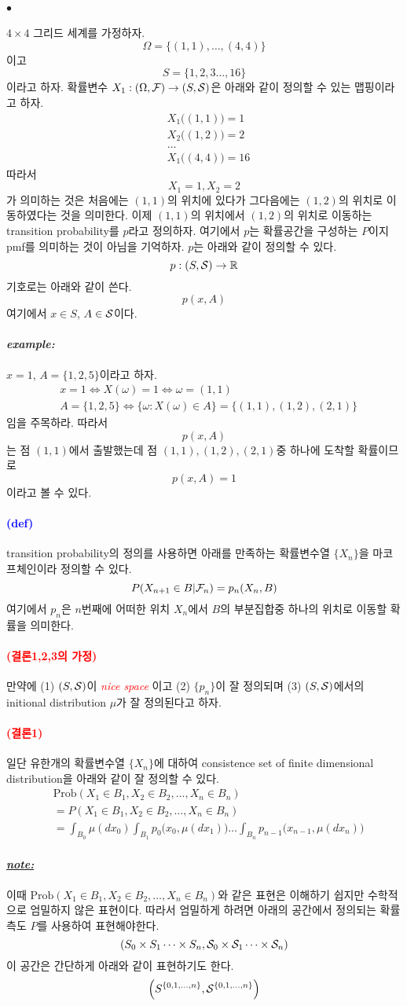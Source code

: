 \documentclass[12pt,oneside,english]{book}
\def\ck{\paragraph{\Large$\bullet$}\Large}
\def\note{\paragraph{\Large\textit{\underline{note:}}}\Large}
\def\ex{\paragraph{\Large\textit{example:}}\Large}
\newcommand{\parablue}[1]{\paragraph{\Large\textcolor{blue}{(#1)}}\Large}
\newcommand{\parared}[1]{\paragraph{\Large\textcolor{red}{(#1)}}\Large}
\begin{document}
\ck $4\times 4$ 그리드 세계를 가정하자. 
\[
\Omega=\{(1,1),\dots,(4,4)\}
\]
이고 
\[
S=\{1,2,3\dots,16\}
\]
이라고 하자. 확률변수 $X_1:(\Omega,{\cal F}) \to (S, {\cal S})$은 아래와 같이 정의할 수 있는 맵핑이라고 하자. 
\begin{align*}
& X_1\big((1,1)\big)=1\\ 
& X_2\big((1,2))=2\\ 
& \dots \\
& X_1\big((4,4)\big)=16
\end{align*}
따라서 
\[
X_1=1, X_2=2
\]
가 의미하는 것은 처음에는 $(1,1)$의 위치에 있다가 그다음에는 $(1,2)$의 위치로 이동하였다는 것을 의미한다. 이제 $(1,1)$의 위치에서 $(1,2)$의 위치로 이동하는 transition probability를 $p$라고 정의하자. 여기에서 $p$는 확률공간을 구성하는 $P$이지 pmf를 의미하는 것이 아님을 기억하자. $p$는 아래와 같이 정의할 수 있다. 
\[
p:(S,{\cal S}) \to \mathbb{R}
\]
기호로는 아래와 같이 쓴다. 
\[
p(x,A)
\]
여기에서 $x \in S$, $A \in {\cal S}$이다. 

\ex $x=1$, $A=\{1,2,5\}$이라고 하자. 
\begin{align*}
& x=1 \Leftrightarrow X(\omega)=1 \Leftrightarrow \omega=(1,1) \\ 
& A=\{1,2,5\} \Leftrightarrow \{\omega:X(\omega) \in A\}=\{(1,1),(1,2),(2,1)\}
\end{align*}
임을 주목하라. 따라서 
\[
p(x,A)
\] 
는 점 $(1,1)$에서 출발했는데 점 $(1,1),(1,2),(2,1)$중 하나에 도착할 확률이므로 
\[
p(x,A)=1
\]
이라고 볼 수 있다. 

\parablue{def} transition probability의 정의를 사용하면 아래를 만족하는 확률변수열 $\{X_n\}$을 마코프체인이라 정의할 수 있다. 
\[
P(X_{n+1}\in B|{\cal F}_n)=p_n(X_n,B)
\]
여기에서 $p_n$은 $n$번째에 어떠한 위치 $X_n$에서 $B$의 부분집합중 하나의 위치로 이동할 확률을 의미한다. 

\parared{결론1,2,3의 가정} 만약에 (1) $(S,{\cal S})$이 \textcolor{red}{\emph{nice space}} 이고 (2) $\{p_n\}$이 잘 정의되며 (3) $(S,{\cal S})$에서의 initional distribution $\mu$가 잘 정의된다고 하자. 

\parared{결론1} 일단 유한개의 확률변수열 $\{X_n\}$에 대하여 consistence set of finite dimensional distribution을 아래와 같이 잘 정의할 수 있다. 
\begin{align*}
& \mbox{Prob}(X_1\in B_1, X_2\in B_2, \dots, X_n \in B_n)\\
& = P(X_1\in B_1, X_2\in B_2, \dots, X_n \in B_n)\\
& = \int_{B_0}\mu(dx_0)\int_{B_1}p_0\big(x_0,\mu(dx_1)\big)\dots\int_{B_n}p_{n-1}\big(x_{n-1},\mu(dx_n)\big)
\end{align*}
\note 이때 $\mbox{Prob}(X_1\in B_1, X_2\in B_2, \dots, X_n \in B_n)$와 같은 표현은 이해하기 쉽지만 수학적으로 엄밀하지 않은 표현이다. 따라서 엄밀하게 하려면 아래의 공간에서 정의되는 확률측도 $P$를 사용하여 표현해야한다. 
\[
(S_0\times S_1 \dots \times S_n, {\cal S}_0\times {\cal S}_1 \dots \times {\cal S}_n)
\]
이 공간은 간단하게 아래와 같이 표현하기도 한다. 
\[
\left(S^{\{0,1,\dots,n\}},{\cal S}^{\{0,1,\dots,n\}}\right)
\]
\end{document}
